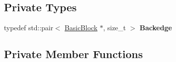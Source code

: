 \subsection*{Private Types}
\begin{DoxyCompactItemize}
\item 
typedef std\+::pair$<$ \hyperlink{classv8_1_1internal_1_1compiler_1_1_basic_block}{Basic\+Block} $\ast$, size\+\_\+t $>$ {\bfseries Backedge}\hypertarget{classv8_1_1internal_1_1compiler_1_1_special_r_p_o_numberer_a0b5c5b7776347a125a6ef4b2394e09dd}{}\label{classv8_1_1internal_1_1compiler_1_1_special_r_p_o_numberer_a0b5c5b7776347a125a6ef4b2394e09dd}

\end{DoxyCompactItemize}
\subsection*{Private Member Functions}
